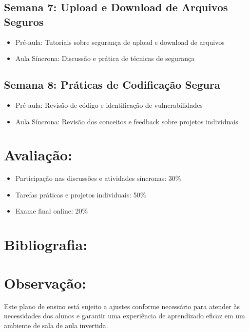 \documentclass{scrartcl}
\begin{document}
\subsection{Semana 7: Upload e Download de Arquivos Seguros}
\label{sec:orgff9026c}
\begin{itemize}
\item Pré-aula: Tutoriais sobre segurança de upload e download de arquivos
\item Aula Síncrona: Discussão e prática de técnicas de segurança
\end{itemize}

\subsection{Semana 8: Práticas de Codificação Segura}
\label{sec:org267189c}
\begin{itemize}
\item Pré-aula: Revisão de código e identificação de vulnerabilidades
\item Aula Síncrona: Revisão dos conceitos e feedback sobre projetos individuais
\end{itemize}

\section{Avaliação:}
\label{sec:orgf31b8cc}
\begin{itemize}
\item Participação nas discussões e atividades síncronas: 30\%
\item Tarefas práticas e projetos individuais: 50\%
\item Exame final online: 20\%
\end{itemize}

\section{Bibliografia:}
\label{sec:org322103f}

\nocite{owasp.top10.2021,li2021,yaworski2019,ball2022,hoffman2020,seitz2021,stuttard2011,hope2008}

\printbibliography[heading=subbibliography,title=Bibliografia Básica,keyword=secure-web-dev:2024:bib:main]

\printbibliography[heading=subbibliography,title=Bibliografia Complementar,keyword=secure-web-dev:2024:bib:aux]


\section{Observação:}
\label{sec:org7feefe7}
Este plano de ensino está sujeito a ajustes conforme necessário para atender às
necessidades dos alunos e garantir uma experiência de aprendizado eficaz em um
ambiente de sala de aula invertida.
\end{document}
